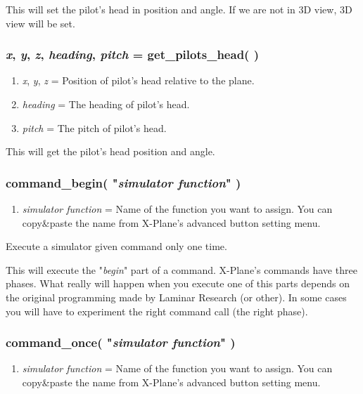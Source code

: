 \documentclass[11pt,parskip=half,a4paper]{scrartcl}
\begin{document}
This will set the pilot's head in position and angle. If we are not in 3D view, 3D view will be set.

\subsubsection{\emph{x}, \emph{y}, \emph{z}, \emph{heading}, \emph{pitch} = get\_pilots\_head(  )}

\begin{enumerate}
	\item \emph{x}, \emph{y}, \emph{z} = Position of pilot's head relative to the plane.
	\item \emph{heading} = The heading of pilot's head.
	\item \emph{pitch} = The pitch of pilot's head.
\end{enumerate}

This will get the pilot's head position and angle.

\subsubsection{command\_begin( "\emph{simulator function}" )}

\begin{enumerate}
	\item \emph{simulator function} = Name of the function you want to assign. You can copy\&paste the name from X-Plane's advanced button setting menu.
\end{enumerate}

Execute a simulator given command only one time.

This will execute the "\emph{begin}" part of a command. X-Plane's commands have three phases. What really will happen when you execute one of this parts depends on the original programming made by Laminar Research  (or other). In some cases you will have to experiment the right command call (the right phase).

\subsubsection{command\_once( "\emph{simulator function}" )}

\begin{enumerate}
	\item \emph{simulator function} = Name of the function you want to assign. You can copy\&paste the name from X-Plane's advanced button setting menu.
\end{enumerate}
\end{document}
